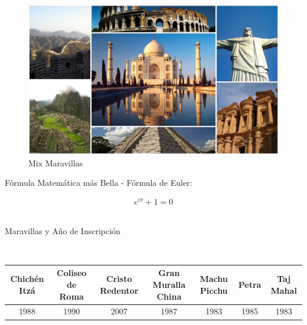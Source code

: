 \documentclass[a4paper,12pt]{article}
\begin{document}
\begin{figure}[h]
\includegraphics[width=1\textwidth]{maravillas}
\caption{Mix Maravillas}
\label{blanco}
\end{figure}


\begin{bf} 
Fórmula Matemática más Bella - Fórmula de Euler:
\end{bf} 

\begin{equation}
e^{i\pi}+1=0
\end{equation}\\

\begin{bf} 
Maravillas y Año de Inscripción
\end{bf}\\ 

\begin{tabular}{|c|c|c|c|c|c|c|}
\hline 
Chichén Itzá & Coliseo de Roma & Cristo Redentor & Gran Muralla China & Machu Picchu & Petra & Taj Mahal \\ 
\hline 
1988 & 1990 & 2007 & 1987 & 1983 & 1985 & 1983 \\ 
\hline 
\end{tabular}\\ \\




\cite{CoxMorris2000}
\end{document}
